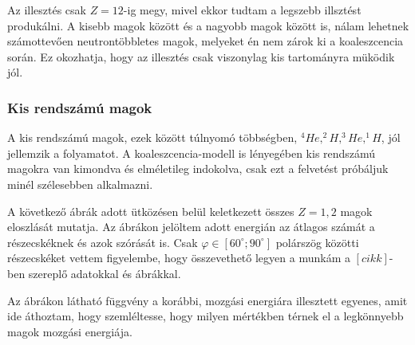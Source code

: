 \documentclass[a4paper,12pt]{article}
\begin{document}
\vspace{5mm}

\par Az illesztés csak $Z = 12$-ig megy, mivel ekkor tudtam a legszebb illsztést produkálni. A kisebb magok között és a nagyobb magok között is, nálam lehetnek számottevően neutrontöbbletes magok, melyeket én nem zárok ki a koaleszcencia során. Ez okozhatja, hogy az illesztés csak viszonylag kis tartományra müködik jól.

\vspace{5mm}

\subsubsection{ Kis rendszámú magok }

\vspace{5mm}

\par A kis rendszámú magok, ezek között túlnyomó többségben, $^{4}He, ^{2}H, ^{3}He, ^{1}H$, jól jellemzik a folyamatot. A koaleszcencia-modell is lényegében kis rendszámú magokra van kimondva és elméletileg indokolva, csak ezt a felvetést próbáljuk minél szélesebben alkalmazni. 

\vspace{5mm}

\par A következő ábrák adott ütközésen belül keletkezett összes $Z = 1, 2$ magok eloszlását mutatja. Az ábrákon jelöltem adott energián az átlagos számát a részecskéknek és azok szórását is. Csak $\varphi \in [60^{\circ};90^{\circ}]$ polárszög közötti részecskéket vettem figyelembe, hogy összevethető legyen a munkám a $[cikk]$-ben szereplő adatokkal és ábrákkal.

\vspace{5mm}

\par Az ábrákon látható függvény a korábbi, mozgási energiára illesztett egyenes, amit ide áthoztam, hogy szemléltesse, hogy milyen mértékben térnek el a legkönnyebb magok mozgási energiája.

\vspace{5mm}
\end{document}
